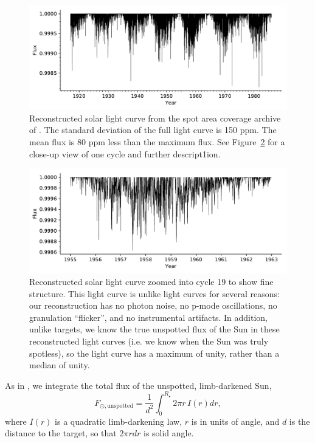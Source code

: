 \begin{figure}
    \centering
    \includegraphics[scale=0.9]{howard/full_lc.pdf}
    \caption{Reconstructed solar light curve from the spot area coverage archive of \citet{Howard1984}. The standard deviation of the full light curve is 150 ppm. The mean flux is 80 ppm less than the maximum flux. See Figure~\ref{fig:cycle19} for a close-up view of one cycle and further descript1ion.}
    \label{fig:lc}
\end{figure}

\begin{figure}
    \centering
    \includegraphics[scale=0.9]{howard/cycle19.pdf}
    \caption{Reconstructed solar light curve zoomed into cycle 19 to show fine structure. This light curve is unlike \kepler light curves for several reasons: our reconstruction has no photon noise, no p-mode oscillations, no granulation ``flicker'', and no instrumental artifacts. In addition, unlike \kepler targets, we know the true unspotted flux of the Sun in these reconstructed light curves (i.e. we know when the Sun was truly spotless), so the light curve has a maximum of unity, rather than a median of unity.}
    \label{fig:cycle19}
\end{figure}

As in \citet{Morris2018b}, we integrate the total flux of the unspotted, limb-darkened Sun,
\begin{equation}
F_{\odot, \mathrm{unspotted}} = \frac{1}{d^2}\int_{0}^{R_\star} 2 \pi r \, I(r) dr,
\end{equation}
where $I(r)$ is a quadratic limb-darkening law, $r$ is in units of angle, and $d$ is the distance to the target, so that $2\pi rdr$ is solid angle.

